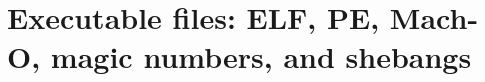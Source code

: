 \chapter{Executable files: ELF, PE, Mach-O, magic numbers, and shebangs}
\label{ch:executable-files-elf-pe-mach-o-magic}


